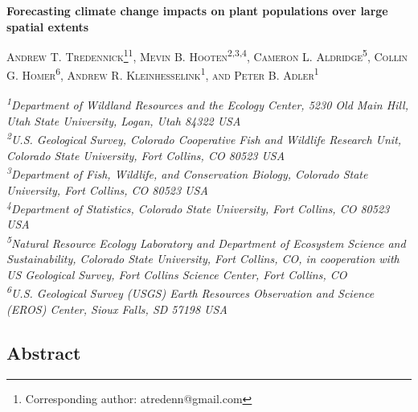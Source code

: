 \documentclass[12pt,]{article}
\title{}
\author{}
\date{}
\let\rmarkdownfootnote\footnote%
\def\footnote{\protect\rmarkdownfootnote}
\begin{document}
\maketitle


\renewcommand*{\thefootnote}{\fnsymbol{footnote}}

\begin{centering}
\textbf{\large{Forecasting climate change impacts on plant populations over large spatial extents}}

\textsc{\small{Andrew T. Tredennick\footnote{Corresponding author: atredenn@gmail.com}\textsuperscript{1}, Mevin B. Hooten\textsuperscript{2,3,4}, Cameron L. Aldridge\textsuperscript{5}, Collin G. Homer\textsuperscript{6}, Andrew R. Kleinhesselink\textsuperscript{1}, and Peter B. Adler\textsuperscript{1}}}

\textit{\small{\textsuperscript{1}Department of Wildland Resources and the Ecology Center, 5230 Old Main Hill, Utah State University, Logan, Utah 84322 USA}} \\
\textit{\small{\textsuperscript{2}U.S. Geological Survey, Colorado Cooperative Fish and Wildlife Research Unit, Colorado State University, Fort Collins, CO 80523 USA}} \\
\textit{\small{\textsuperscript{3}Department of Fish, Wildlife, and Conservation Biology, Colorado State University, Fort Collins, CO 80523 USA}} \\
\textit{\small{\textsuperscript{4}Department of Statistics, Colorado State University, Fort Collins, CO 80523 USA}} \\
\textit{\small{\textsuperscript{5}Natural Resource Ecology Laboratory and Department of Ecosystem Science and Sustainability, Colorado State University, Fort Collins, CO, in cooperation with US Geological Survey, Fort Collins Science Center, Fort Collins, CO}}\\
\textit{\small{\textsuperscript{6}U.S. Geological Survey (USGS) Earth Resources Observation and Science (EROS) Center, Sioux Falls, SD 57198 USA}}

\end{centering}

\renewcommand*{\thefootnote}{\arabic{footnote}}

\setcounter{footnote}{0}

\subsection{Abstract}\label{abstract}
\end{document}
